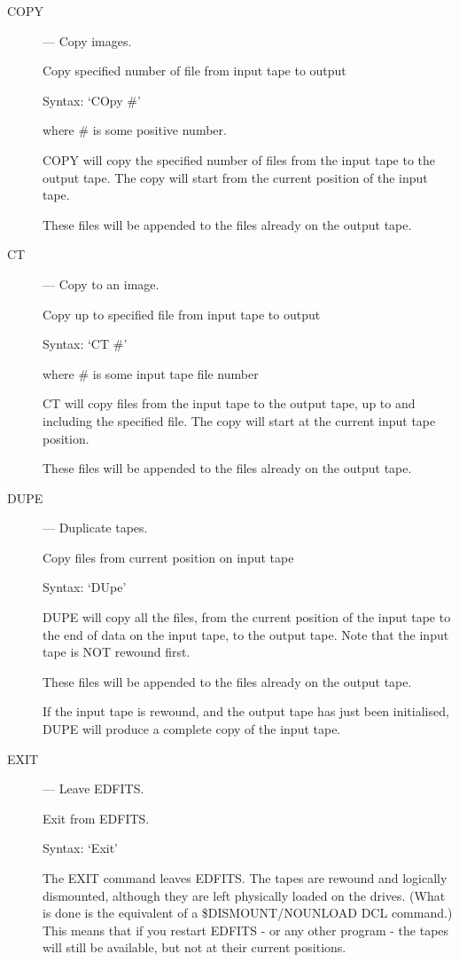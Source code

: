 \begin{description}

\item [COPY] --- Copy images.

Copy specified number of file from input tape to output

Syntax:   `COpy  \#'

where \# is some positive number.

COPY will copy the specified number of files from the input tape to
the output tape.  The copy will start from the current position of the
input tape.

These files will be appended to the files already on the output
tape.

\item [CT] --- Copy to an image.

Copy up to specified file from input tape to output

Syntax:  `CT \#'

where \# is some input tape file number

CT will copy files from the input tape to the output tape, up to
and including the specified file. The copy will start at the current
input tape position.

These files will be appended to the files already on the output
tape.

\item [DUPE] --- Duplicate tapes.

Copy files from current position on input tape

Syntax:    `DUpe'

DUPE will copy all the files, from the current position of the
input tape to the end of data on the input tape, to the output
tape.   Note that the input tape is NOT rewound first.

These files will be appended to the files already on the output
tape.

If the input tape is rewound, and the output tape has just been
initialised, DUPE will produce a complete copy of the input tape.

\item [EXIT] --- Leave EDFITS.

Exit from EDFITS.

Syntax:  `Exit'

The EXIT command leaves EDFITS.  The tapes are rewound and logically
dismounted,  although they are left physically loaded on the drives.
(What is done is the equivalent of a \$DISMOUNT/NOUNLOAD DCL command.)
This means that if you restart EDFITS - or any other program - the tapes
will still be available, but not at their current positions.


\end{description}
